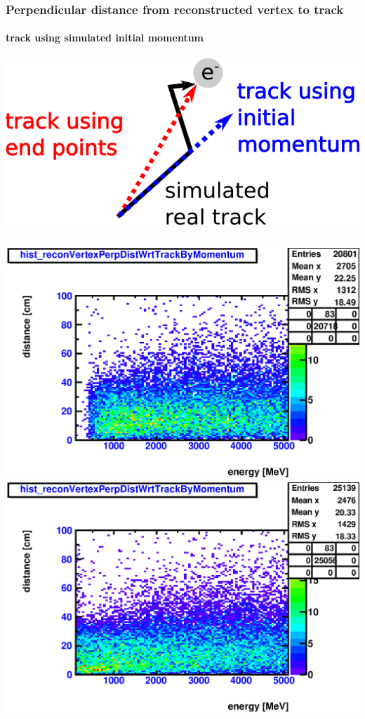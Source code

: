 \documentclass{beamer}
\begin{document}
\begin{frame}
	\frametitle{Perpendicular distance from reconstructed vertex to track}
	\framesubtitle{track using simulated initial momentum}
	\begin{center}
		\includegraphics[height=0.2\textheight]{track_definition.png}
	\end{center}
	\begin{columns}[t]
		\includegraphics[width=1.0\textwidth]{nue_H1_reconVertexPerpDistWrtTrackByMomentum_onlyCC_maxR600cm.eps}
		\includegraphics[width=1.0\textwidth]{nue_C12_reconVertexPerpDistWrtTrackByMomentum_onlyCC_maxR600cm.eps}
	\end{columns}
\end{frame}
\end{document}
